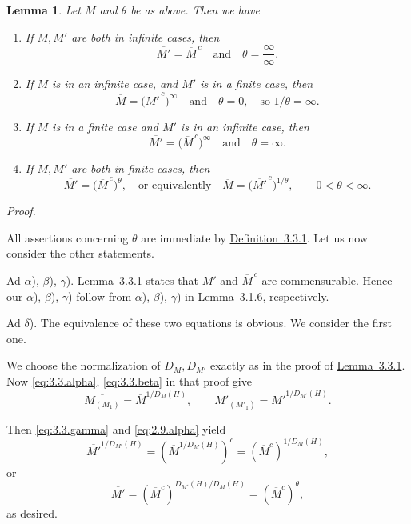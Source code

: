 \documentclass[b5paper,twoside]{article}
\newcommand{\lemref}[2]{\hyperref[#1]{\mbox{Lemma~#2}}}
\newcommand{\defref}[2]{\hyperref[#1]{\mbox{Definition~#2}}}
\theoremstyle{mvnplain}
\newtheorem{lemma}{Lemma}[section]
\renewenvironment{proof}[1][Proof]{%
  \par\addvspace{0.35\baselineskip}%
  \noindent\textit{#1.}\ \normalfont\ignorespaces
}{%
  \par\addvspace{0.35\baselineskip}%
}
\newcommand{\M}{\mathbf M}
\newcommand{\Hilbert}{\mathfrak H}
\def\M{M}%
\def\Hilbert{H}%
\def\mathfrak#1{#1}%
\begin{document}
\begin{lemma}\label{lem:3.3.2}
Let \(\M\) and \(\theta\) be as above. Then we have
\begin{enumerate}[label={}]
\item[\(\alpha\))] If \(\M,\M'\) are both in infinite cases, then
\[
  \overline{\M'}=\overline{\M}^{\,c}
  \quad\text{and}\quad \theta=\frac{\infty}{\infty}.
\]
\item[\(\beta\))] If \(\M\) is in an infinite case, and \(\M'\) is in a finite case,
then
\[
  \overline{\M}=\bigl(\overline{\M'}^{\,c}\bigr)^\infty
  \quad\text{and}\quad \theta=0,\quad\text{so }1/\theta=\infty.
\]
\item[\(\gamma\))] If \(\M\) is in a finite case and \(\M'\) is in an infinite case,
then
\[
  \overline{\M'}=\bigl(\overline{\M}^{\,c}\bigr)^\infty
  \quad\text{and}\quad \theta=\infty.
\]
\item[\(\delta\))] If \(\M,\M'\) are both in finite cases, then
\[
  \overline{\M'}=\bigl(\overline{\M}^{\,c}\bigr)^\theta,
  \quad\text{or equivalently}\quad
  \overline{\M}=\bigl(\overline{\M'}^{\,c}\bigr)^{1/\theta},
  \qquad 0<\theta<\infty.
\]
\end{enumerate}
\end{lemma}

\begin{proof}
All assertions concerning \(\theta\) are immediate by
\defref{def:3.3.1}{3.3.1}. Let us now consider the other statements.

Ad \(\alpha\)), \(\beta\)), \(\gamma\)). \lemref{lem:3.3.1}{3.3.1}
states that \(\overline{\M'}\) and \(\overline{\M}^{\,c}\) are
commensurable. Hence our \(\alpha\)), \(\beta\)), \(\gamma\)) follow from
\(\alpha\)), \(\beta\)), \(\gamma\)) in \lemref{lem:3.1.6}{3.1.6},
respectively.

Ad \(\delta\)). The equivalence of these two equations is obvious. We
consider the first one.

We choose the normalization of \(D_{\M},D_{\M'}\) exactly as in the proof of
\lemref{lem:3.3.1}{3.3.1}. Now \eqref{eq:3.3.alpha},
\eqref{eq:3.3.beta} in that proof give
\[
  \overline{\M_{(\mathfrak M_1)}}
 =\overline{\M}^{1/D_{\M}(\Hilbert)},
  \qquad
  \overline{\M'_{(\mathfrak M'_1)}}
 =\overline{\M'}^{1/D_{\M'}(\Hilbert)}.
\]

Then \eqref{eq:3.3.gamma} and \eqref{eq:2.9.alpha} yield
\[
 \overline{\M'}^{1/D_{\M'}(\Hilbert)}
 =\left(\overline{\M}^{1/D_{\M}(\Hilbert)}\right)^c
 =\left(\overline{\M}^{c}\right)^{1/D_{\M}(\Hilbert)},
\]
or
\[
  \overline{\M'}
 =\left(\overline{\M}^{c}\right)^{D_{\M'}(\Hilbert)/D_{\M}(\Hilbert)}
 =\left(\overline{\M}^{c}\right)^\theta,
\]
as desired.
\end{proof}
\end{document}
